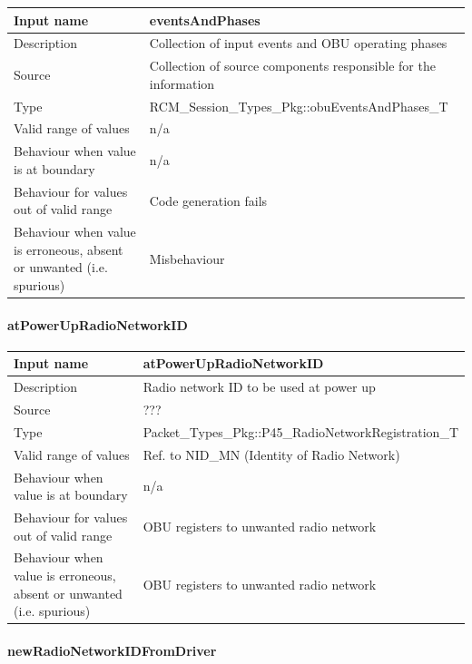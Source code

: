 \begin{longtable}{p{}p{}}
	\toprule
	Input name				& eventsAndPhases \\
	\midrule
	Description				& Collection of input events and OBU operating phases \\
	\midrule
	Source					& Collection of source components responsible for the information \\ 
	\midrule
	Type					& RCM\_Session\_Types\_Pkg::obuEventsAndPhases\_T \\
	\midrule
	Valid range of values	& n/a \\
	\midrule
	Behaviour when value is at boundary	& n/a \\
	\midrule
	Behaviour for values out of valid range	& Code generation fails \\
	\midrule
	Behaviour when value is erroneous, absent or unwanted (i.e. spurious) & Misbehaviour \\
	\bottomrule
\end{longtable}

\paragraph{atPowerUpRadioNetworkID}

\begin{longtable}{p{}p{}}
	\toprule
	Input name				& atPowerUpRadioNetworkID \\
	\midrule
	Description				& Radio network ID to be used at power up \\
	\midrule
	Source					& ??? \\ 
	\midrule
	Type					& Packet\_Types\_Pkg::P45\_RadioNetworkRegistration\_T \\
	\midrule
	Valid range of values	& Ref. to NID\_MN (Identity of Radio Network)  \\
	\midrule
	Behaviour when value is at boundary	& n/a \\
	\midrule
	Behaviour for values out of valid range	& OBU registers to unwanted radio network \\
	\midrule
	Behaviour when value is erroneous, absent or unwanted (i.e. spurious) & OBU registers to unwanted radio network  \\
	\bottomrule
\end{longtable}

\paragraph{newRadioNetworkIDFromDriver}

